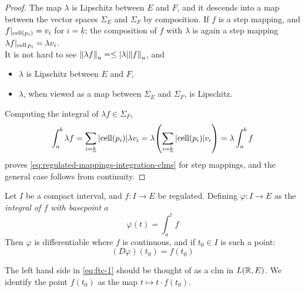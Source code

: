 \documentclass[../main-manifolds.tex]{subfiles}
\begin{document}
\begin{proof}
    The map $\lambda$ is Lipschitz between $E$ and $F$, and it descends into a map between the vector spaces $\Sigma_E$ and $\Sigma_F$ by composition. If $f$ is a step mapping, and $f\vert_{\operatorname{cell}(p_i)} = v_i$ for $i = \underline{k}$; the composition of $f$ with $\lambda$ is again a step mapping $\lambda f\vert_{\operatorname{cell}{p_i}} = \lambda v_i$.\\
    
    It is not hard to see $\norm{\lambda f}_u = \leq \abs{\lambda}\norm{f}_u$, and 
    \begin{itemize}
        \item $\lambda$ is Lipschitz between $E$ and $F$,
        \item $\lambda$, when viewed as a map between $\Sigma_E$ and $\Sigma_F$, is Lipschitz.
    \end{itemize}
    Computing the integral of $\lambda f\in \Sigma_F$,
    \[
        \int_a^b \lambda f = \sum_{i=\underline{k}}\abs{\operatorname{cell}(p_i)}\lambda v_i = \lambda\qty(\sum_{i=\underline{k}}\abs{\operatorname{cell}(p_i)} v_i) = \lambda \int_a^b f
    \]
    proves \cref{eq:regulated-mappings-integration-clms} for step mappings, and the general case follows from continuity.
\end{proof}
\begin{wts}
    Let $I$ be a compact interval, and $f: I\to E$ be regulated. Defining $\varphi:I \to E$ as the \emph{integral of $f$ with basepoint $a$}
    \begin{equation}\label{eq:ftc-phi-def}
        \varphi(t) = \int_a^t f
    \end{equation}
    Then $\varphi$ is differentiable where $f$ is continuous, and if $t_0\in I$ is such a point:
    \begin{equation}\label{eq:ftc-1}
        (D\varphi)(t_0) = f(t_0)
    \end{equation}
\end{wts}
\begin{remark}[Identifications]
    The left hand side in \cref{eq:ftc-1} should be thought of as a clm in $L(\mathbb{R}, E)$. We identify the point $f(t_0)$ as the map $t\mapsto t\cdot f(t_0)$.
\end{remark}

\end{document}
